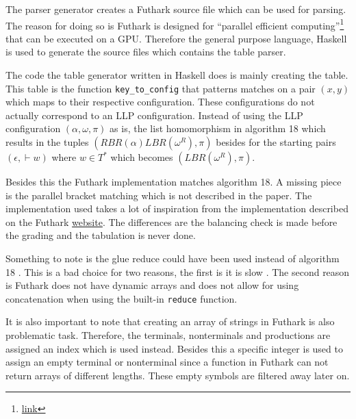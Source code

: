 The parser generator creates a Futhark source file which can be used for parsing. The reason for doing so is Futhark is designed for ``parallel efficient computing''\footnote{\href{https://futhark-lang.org/}{link}} that can be executed on a GPU. Therefore the general purpose language, Haskell is used to generate the source files which contains the table parser.

The code the table generator written in Haskell does is mainly creating the table. This table is the function \lstinline{key_to_config} that patterns matches on a pair $(x, y)$ which maps to their respective configuration. These configurations do not actually correspond to an LLP configuration. Instead of using the LLP configuration $(\alpha, \omega, \pi)$ as is, the list homomorphism in algorithm 18 \cite[18]{Vagner2007} which results in the tuples $(RBR(\alpha)LBR(\omega^R), \pi)$ besides for the starting pairs $(\epsilon, \vdash w)$ where $w \in T^*$ which becomes $(LBR(\omega^R), \pi)$.

Besides this the Futhark implementation matches algorithm 18. A missing piece is the parallel bracket matching which is not described in the paper. The implementation used takes a lot of inspiration from the implementation described on the Futhark \href{https://futhark-lang.org/examples/parens.html}{website}. The differences are the balancing check is made before the grading and the tabulation is never done.

Something to note is the glue \cite[7]{Vagner2007} reduce could have been used instead of algorithm 18 \cite[18]{Vagner2007}. This is a bad choice for two reasons, the first is it is slow \cite[17]{Vagner2007}. The second reason is Futhark does not have dynamic arrays and does not allow for using concatenation when using the built-in \lstinline{reduce} function.

It is also important to note that creating an array of strings in Futhark is also problematic task. Therefore, the terminals, nonterminals and productions are assigned an index which is used instead. Besides this a specific integer is used to assign an empty terminal or nonterminal since a function in Futhark can not return arrays of different lengths. These empty symbols are filtered away later on.